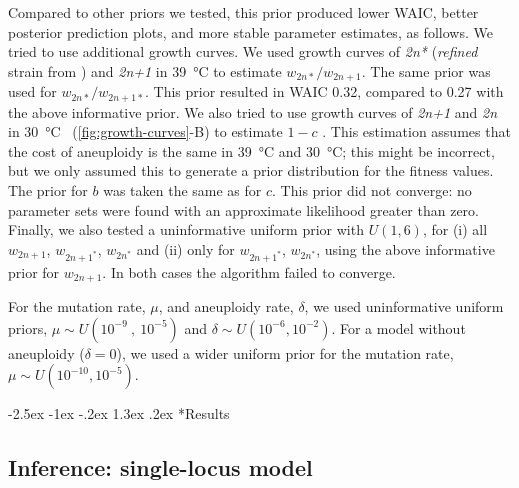 \documentclass[12pt]{extarticle}
\makeatletter
\renewcommand\section{\@startsection {section}{1}{\z@}%
     {-2.5ex \@plus -1ex \@minus -.2ex}%
     {1.3ex \@plus.2ex}%
    {\Large\bfseries}}
\newcommand{\euwt}{\emph{2n}}
\newcommand{\anwt}{\emph{2n+1}}
\newcommand{\eumt}{\emph{2n*}}
\makeatother
\begin{document}
Compared to other priors we tested, this prior produced lower WAIC, better posterior prediction plots, and more stable parameter estimates, as follows.
We tried to use additional growth curves. We used growth curves of \eumt\; (\emph{refined} strain from \citet{Yona2012}) and \anwt\; in \SI{39}{\celsius} to estimate $w_{2n*}/w_{2n+1}$. The same prior was used for $w_{2n*}/w_{2n+1*}$. This prior resulted in WAIC 0.32, compared to 0.27 with the above informative prior.
We also tried to use growth curves of \anwt\; and \euwt\; in \SI{30}{\celsius} ~(\cref{fig:growth-curves}-B) to estimate $1-c$ . This estimation assumes that the cost of aneuploidy is the same in \SI{39}{\celsius} and \SI{30}{\celsius}; this might be incorrect, but we only assumed this to generate a prior distribution for the fitness values. The prior for $b$ was taken the same as for $c$. This prior did not converge: no parameter sets were found with an approximate likelihood greater than zero.
Finally, we also tested a uninformative uniform prior with $\mathit{U}(1,6)$, for (i) all $w_{2n+1}$, $w_{2n+1^*}$, $w_{2n^*}$ and (ii) only for $w_{2n+1^*}$, $w_{2n^*}$, using the above informative prior for $w_{2n+1}$. In both cases the algorithm failed to converge.
 
For the mutation rate, $\mu$, and aneuploidy rate, $\delta$, we used uninformative uniform priors, $\mu \sim \mathit{U}(10^{-9}\ ,\ 10^{-5})$ and $\delta \sim \mathit{U}(10^{-6} , 10^{-2})$.
For a model without aneuploidy ($\delta=0$), we used a wider uniform prior for the mutation rate, $\mu \sim \mathit{U}(10^{-10},10^{-5})$. 

\section*{Results}

\subsection*{Inference: single-locus model}

\end{document}
